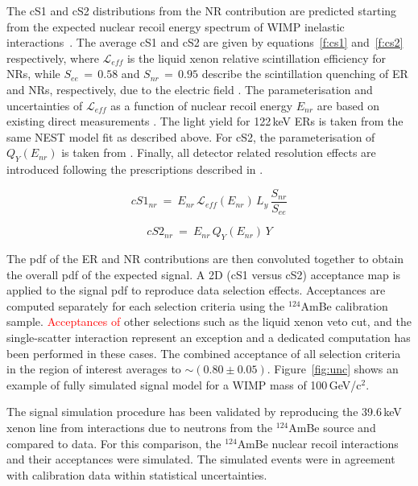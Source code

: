 The cS1 and cS2 distributions from the NR contribution are predicted starting from the expected nuclear recoil energy spectrum
of WIMP inelastic interactions~\cite{Baudis:2013bba}. The average cS1 and cS2 are given by equations~\ref{f:cs1} and~\ref{f:cs2} respectively,
where $\mathcal{L}_{eff}$ is the liquid xenon relative scintillation efficiency for NRs, while $S_{ee} \, = \, 0.58$  and $S_{nr} \, = \, 0.95$ describe the scintillation 
quenching  of ER and NRs, respectively, due to the electric field \cite{ScintQuenching}. The parameterisation and uncertainties of $\mathcal{L}_{eff}$ as a function of nuclear recoil energy $E_{nr}$ are based on existing 
direct measurements \cite{run8Result}. The light yield for 122\,keV ERs is taken from the same NEST model fit as described above. For cS2, the parameterisation 
of $Q_{Y}(E_{nr})$ is taken from \cite{QY}. Finally, all detector related resolution effects are introduced following the prescriptions described in \cite{Aprile:2012vw}.

\begin{equation}
cS1_{nr} ~=~ E_{nr} \, \mathcal{L}_{eff}(E_{nr}) \, L_{y} \, \frac{S_{nr}}{S_{ee}}
\label{f:cs1}
\end{equation}

\begin{equation}
cS2_{nr}  ~ = ~ E_{nr} \, Q_{Y}(E_{nr}) \, Y
\label{f:cs2}
\end{equation}

The pdf of the ER and NR contributions are then convoluted together to obtain the overall pdf of the expected signal.
A 2D (cS1 versus cS2) acceptance map is applied to the signal pdf to reproduce data selection effects. Acceptances are computed separately for each selection 
criteria using the $^{124}$AmBe calibration sample. \textcolor{red}{Acceptances of} other selections such as the liquid xenon veto cut, and the single-scatter interaction represent an exception  and 
a dedicated computation has been performed in these cases. The combined acceptance  of all selection criteria in the region of interest averages to $\sim$$(0.80\pm0.05)$. 
Figure~\ref{fig:unc} shows an example of fully simulated signal model for a WIMP mass of 100\,GeV/c$^2$. 

The signal simulation procedure has been validated by reproducing the 39.6\,keV xenon line from interactions due to neutrons from the 
$^{124}$AmBe source and compared to data. For this comparison, the  $^{124}$AmBe nuclear recoil interactions and their acceptances
were simulated. The simulated events were in agreement  with calibration data within statistical uncertainties. 



